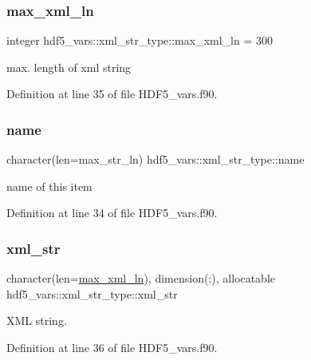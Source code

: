 \subsubsection{\texorpdfstring{max\+\_\+xml\+\_\+ln}{max\_xml\_ln}}
{\footnotesize\ttfamily integer hdf5\+\_\+vars\+::xml\+\_\+str\+\_\+type\+::max\+\_\+xml\+\_\+ln = 300}



max. length of xml string 



Definition at line 35 of file H\+D\+F5\+\_\+vars.\+f90.

\mbox{\label{structhdf5__vars_1_1xml__str__type_abb896e4f55a807dee4d91c139b63f1c2}} 
\subsubsection{\texorpdfstring{name}{name}}
{\footnotesize\ttfamily character(len=max\+\_\+str\+\_\+ln) hdf5\+\_\+vars\+::xml\+\_\+str\+\_\+type\+::name}



name of this item 



Definition at line 34 of file H\+D\+F5\+\_\+vars.\+f90.

\mbox{\label{structhdf5__vars_1_1xml__str__type_a2e13e1a8db0b6e15f7213ca3f376b07f}} 
\subsubsection{\texorpdfstring{xml\+\_\+str}{xml\_str}}
{\footnotesize\ttfamily character(len=\hyperlink{structhdf5__vars_1_1xml__str__type_aed78e13b1e4adc34c43797ebcea2c389}{max\+\_\+xml\+\_\+ln}), dimension(\+:), allocatable hdf5\+\_\+vars\+::xml\+\_\+str\+\_\+type\+::xml\+\_\+str}



X\+ML string. 



Definition at line 36 of file H\+D\+F5\+\_\+vars.\+f90.



